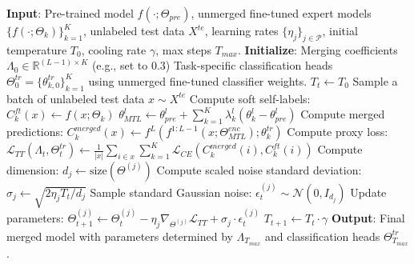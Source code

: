 \begin{algorithm}[tb]
\caption{ThermoMerge: Thermodynamic Test-Time Model Merging}
\label{alg:thermomerge}
\begin{algorithmic}[1]
\STATE \textbf{Input}: Pre-trained model $f(\cdot; \Theta_{pre})$, unmerged fine-tuned expert models $\{f(\cdot; \Theta_k)\}_{k=1}^K$, unlabeled test data $X^{te}$, learning rates $\{\eta_j\}_{j \in \mathcal{P}}$, initial temperature $T_0$, cooling rate $\gamma$, max steps $T_{max}$.
\STATE \textbf{Initialize}: 
\STATE \quad Merging coefficients $\Lambda_0 \in \mathbb{R}^{(L-1) \times K}$ (e.g., set to $0.3$)
\STATE \quad Task-specific classification heads $\Theta^{tr}_0 = \{\theta^{tr}_{k, 0}\}_{k=1}^K$ using unmerged fine-tuned classifier weights.
\STATE \quad $T_t \leftarrow T_0$
    \STATE Sample a batch of unlabeled test data $x \sim X^{te}$
    \STATE {}
        \STATE Compute soft self-labels: $C_k^{ft}(x) \leftarrow f(x; \Theta_k)$
    \ENDFOR
    \STATE {}
        \STATE $\theta_{MTL}^l \leftarrow \theta_{pre}^l + \sum_{k=1}^K \lambda_k^l (\theta_k^l - \theta_{pre}^l)$
    \ENDFOR
    \STATE {}
    \STATE Compute merged predictions: $C_k^{merged}(x) \leftarrow f^L(f^{1:L-1}(x; \Theta_{MTL}^{enc}); \theta^{tr}_k)$
    \STATE {}
    \STATE Compute proxy loss: $\mathcal{L}_{TT}(\Lambda_t, \Theta^{tr}_t) \leftarrow \frac{1}{|x|} \sum_{i \in x} \sum_{k=1}^K \mathcal{L}_{CE}(C_k^{merged}(i), C_k^{ft}(i))$
    \STATE {}
        \STATE Compute dimension: $d_j \leftarrow \text{size}(\Theta^{(j)})$
        \STATE Compute scaled noise standard deviation: $\sigma_j \leftarrow \sqrt{2 \eta_j T_t / d_j}$
        \STATE Sample standard Gaussian noise: $\epsilon^{(j)}_t \sim \mathcal{N}(0, I_{d_j})$
        \STATE Update parameters: $\Theta^{(j)}_{t+1} \leftarrow \Theta^{(j)}_t - \eta_j \nabla_{\Theta^{(j)}} \mathcal{L}_{TT} + \sigma_j \cdot \epsilon^{(j)}_t$
    \ENDFOR
    \STATE {}
    \STATE $T_{t+1} \leftarrow T_t \cdot \gamma$
\ENDFOR
\STATE \textbf{Output}: Final merged model with parameters determined by $\Lambda_{T_{max}}$ and classification heads $\Theta^{tr}_{T_{max}}$.
\end{algorithmic}
\end{algorithm}